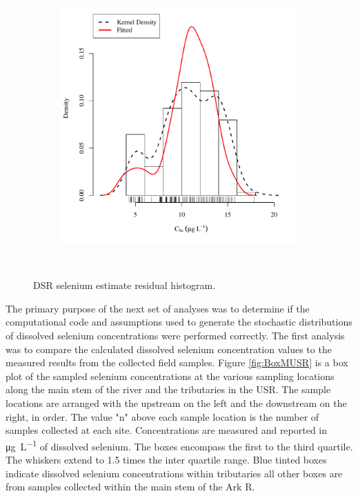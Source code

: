 \subfiguremid
\begin{landscape}
	\begin{figure}
		\begin{subfigure}{0.7\textwidth}
			\centering
			\includegraphics[width=\tableCustomSize]{"Figures/Results_DSR/Stochastic/Conc Model ResDist DDIV"}
		\end{subfigure}\\
		\caption{DSR selenium estimate residual histogram.}
	\end{figure}
\end{landscape}
\subfiguretop


The primary purpose of the next set of analyses was to determine if the computational code and assumptions used to generate the stochastic distributions of dissolved selenium concentrations were performed correctly. The first analysis was to compare the calculated dissolved selenium concentration values to the measured results from the collected field samples.  Figure \ref{fig:BoxMUSR} is a box plot of the sampled selenium concentrations at the various sampling locations along the main stem of the river and the tributaries in the USR.  The sample locations are arranged with the upstream on the left and the downstream on the right, in order.  The value "n" above each sample location is the number of samples collected at each site.  Concentrations are measured and reported in \si{\micro\gram\per\liter} of dissolved selenium.  The boxes encompass the first to the third quartile.  The whiskers extend to 1.5 times the inter quartile range.  Blue tinted boxes indicate dissolved selenium concentrations within tributaries all other boxes are from samples collected within the main stem of the Ark R.


